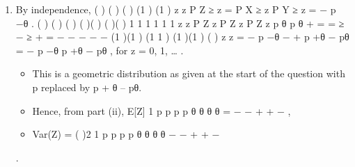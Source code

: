 \documentclass[a4paper,12pt]{article}
\begin{document}
\begin{enumerate}
\item  By independence, ( ) ( ) ( ) (1 ) (1 ) z z P Z ≥ z = P X ≥ z P Y ≥ z = − p −θ .
( ) ( ) ( ) {( )( )} {( )( )} 1 1 1 1 1 1 z z P Z z P Z z P Z z p θ p θ + = = ≥ − ≥ + = − − − − −
{(1 )(1 )} (1 1 ) {(1 )(1 )} ( ) z z = − p −θ − + p +θ − pθ = − p −θ p +θ − pθ , for z = 0, 1, … .
\begin{itemize}
\item This is a geometric distribution as given at the start of the question with p replaced by
p + θ – pθ. 
\item Hence, from part (ii),
E[Z] 1 p p
p p
θ θ
θ θ
= − − +
+ −
, 
\item Var(Z) =
( )2
1 p p
p p
θ θ
θ θ
− − +
+ −
\end{itemize}
.

\end{enumerate}
\end{document}
